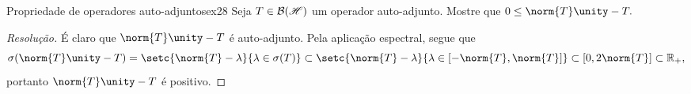 \begin{exercício}{Propriedade de operadores auto-adjuntos}{ex28}
  Seja \(T \in \mathcal{B}(\mathscr{H})\) um operador auto-adjunto. Mostre que \(0 \leq \norm{T}\unity - T.\)
\end{exercício}
\begin{proof}[Resolução]
  É claro que \(\norm{T} \unity - T\) é auto-adjunto. Pela aplicação espectral, segue que
  \begin{equation*}
    \sigma(\norm{T}\unity - T) = \setc{\norm{T} - \lambda}{\lambda \in \sigma(T)} \subset \setc{\norm{T} - \lambda}{\lambda \in [-\norm{T}, \norm{T}]} \subset [0, 2\norm{T}] \subset \mathbb{R}_+,
  \end{equation*}
  portanto \(\norm{T} \unity - T\) é positivo.
\end{proof}
